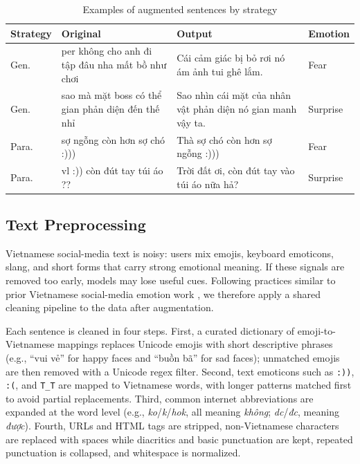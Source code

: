 \documentclass[conference]{IEEEtran}
\begin{document}
\begin{table}[H]
\caption{Examples of augmented sentences by strategy}
\label{tab:gen_examples}
\centering
\footnotesize
\begin{tabular}{@{}lp{}p{}l@{}}
\toprule
Strategy & Original & Output & Emotion \\
\midrule
Gen. & per không cho anh đi tập đâu nha mất bồ như chơi &
  Cái cảm giác bị bỏ rơi nó ám ảnh tui ghê lắm. & Fear \\[2pt]
Gen. & sao mà mặt boss có thể gian phản diện đến thế nhỉ &
  Sao nhìn cái mặt của nhân vật phản diện nó gian manh vậy ta. & Surprise \\[2pt]
Para. & sợ ngỗng còn hơn sợ chó :))) &
  Thà sợ chó còn hơn sợ ngỗng :))) & Fear \\[2pt]
Para. & vl :)) còn đút tay túi áo ?? &
  Trời đất ơi, còn đút tay vào túi áo nữa hả? & Surprise \\[2pt]
\bottomrule
\end{tabular}
\end{table}

\subsection{Text Preprocessing}

Vietnamese social-media text is noisy: users mix emojis, keyboard emoticons, slang, and
short forms that carry strong emotional meaning. If these signals are removed too early,
models may lose useful cues. Following practices similar to prior Vietnamese social-media
emotion work \cite{nguyen2020exploiting,duong2021review}, we therefore apply a shared
cleaning pipeline to the data after augmentation.

Each sentence is cleaned in four steps. First, a curated dictionary of emoji-to-Vietnamese mappings replaces Unicode emojis with short descriptive phrases (e.g., ``vui vẻ'' for
happy faces and ``buồn bã'' for sad faces); unmatched emojis are then removed with a
Unicode regex filter. Second, text emoticons such as \texttt{:))}, \texttt{:(}, and
\texttt{T\_T} are mapped to Vietnamese words, with longer patterns matched first to avoid partial replacements. Third, common internet abbreviations are expanded at the word level (e.g., \textit{ko}/\textit{k}/\textit{hok}, all meaning \textit{không};
\textit{dc}/\textit{đc}, meaning \textit{được}). Fourth, URLs and HTML tags are stripped, non-Vietnamese characters are replaced with spaces while diacritics and basic punctuation are kept, repeated punctuation is collapsed, and whitespace is normalized.
\end{document}

